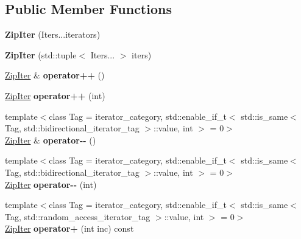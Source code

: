 \subsection*{Public Member Functions}
\begin{DoxyCompactItemize}
\item 
{\bfseries Zip\+Iter} (Iters...\+iterators)\hypertarget{classit_1_1ZipIter_a9491d35ab82c2bde264651e987bbf6c6}{}\label{classit_1_1ZipIter_a9491d35ab82c2bde264651e987bbf6c6}

\item 
{\bfseries Zip\+Iter} (std\+::tuple$<$ Iters... $>$ iters)\hypertarget{classit_1_1ZipIter_aff4b29aa35878167109dd76833809b83}{}\label{classit_1_1ZipIter_aff4b29aa35878167109dd76833809b83}

\item 
\hyperlink{classit_1_1ZipIter}{Zip\+Iter} \& {\bfseries operator++} ()\hypertarget{classit_1_1ZipIter_a2b53805db121857244da4160acef8044}{}\label{classit_1_1ZipIter_a2b53805db121857244da4160acef8044}

\item 
\hyperlink{classit_1_1ZipIter}{Zip\+Iter} {\bfseries operator++} (int)\hypertarget{classit_1_1ZipIter_a1a157270063486cc0d0e33e7bbc39e67}{}\label{classit_1_1ZipIter_a1a157270063486cc0d0e33e7bbc39e67}

\item 
{\footnotesize template$<$class Tag  = iterator\+\_\+category, std\+::enable\+\_\+if\+\_\+t$<$ std\+::is\+\_\+same$<$ Tag, std\+::bidirectional\+\_\+iterator\+\_\+tag $>$\+::value, int $>$  = 0$>$ }\\\hyperlink{classit_1_1ZipIter}{Zip\+Iter} \& {\bfseries operator-\/-\/} ()\hypertarget{classit_1_1ZipIter_aff23b7d5ca91c2c01c5c14cf9daf8667}{}\label{classit_1_1ZipIter_aff23b7d5ca91c2c01c5c14cf9daf8667}

\item 
{\footnotesize template$<$class Tag  = iterator\+\_\+category, std\+::enable\+\_\+if\+\_\+t$<$ std\+::is\+\_\+same$<$ Tag, std\+::bidirectional\+\_\+iterator\+\_\+tag $>$\+::value, int $>$  = 0$>$ }\\\hyperlink{classit_1_1ZipIter}{Zip\+Iter} {\bfseries operator-\/-\/} (int)\hypertarget{classit_1_1ZipIter_accf9e1869dc402c52c8afb685de7b48f}{}\label{classit_1_1ZipIter_accf9e1869dc402c52c8afb685de7b48f}

\item 
{\footnotesize template$<$class Tag  = iterator\+\_\+category, std\+::enable\+\_\+if\+\_\+t$<$ std\+::is\+\_\+same$<$ Tag, std\+::random\+\_\+access\+\_\+iterator\+\_\+tag $>$\+::value, int $>$  = 0$>$ }\\\hyperlink{classit_1_1ZipIter}{Zip\+Iter} {\bfseries operator+} (int inc) const \hypertarget{classit_1_1ZipIter_a4ea2caaae3c945d3e3cc03ade67dcf5f}{}\label{classit_1_1ZipIter_a4ea2caaae3c945d3e3cc03ade67dcf5f}


\end{DoxyCompactItemize}
